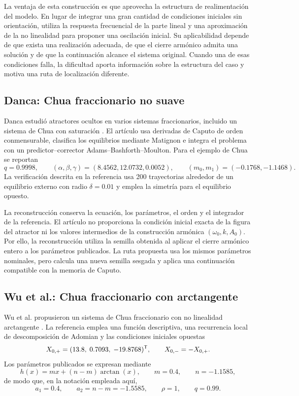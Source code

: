 La ventaja de esta construcción es que aprovecha la estructura de
realimentación del modelo. En lugar de integrar una gran cantidad de
condiciones iniciales sin orientación, utiliza la respuesta frecuencial
de la parte lineal y una aproximación de la no linealidad para proponer
una oscilación inicial. Su aplicabilidad depende de que exista una
realización adecuada, de que el cierre armónico admita una solución y
de que la continuación alcance el sistema original. Cuando una de esas
condiciones falla, la dificultad aporta información sobre la estructura
del caso y motiva una ruta de localización diferente.

\subsection{Danca: Chua fraccionario no suave}

Danca estudió atractores ocultos en varios sistemas fraccionarios, incluido un
sistema de Chua con saturación \cite{Danca2017}. El artículo usa derivadas
de Caputo de orden conmensurable, clasifica los equilibrios mediante Matignon e integra
el problema con un predictor--corrector Adams--Bashforth--Moulton. Para el
ejemplo de Chua se reportan
\[
q=0.9998,\qquad
(\alpha,\beta,\gamma)=(8.4562,12.0732,0.0052),\qquad
(m_0,m_1)=(-0.1768,-1.1468).
\]
La verificación descrita en la referencia usa 200 trayectorias alrededor de un
equilibrio externo con radio \(\delta=0.01\) y emplea la simetría para el
equilibrio opuesto.

La reconstrucción conserva la ecuación, los
parámetros, el orden y el integrador de la referencia. El artículo no
proporciona la condición inicial exacta de la figura del atractor ni los
valores intermedios de la construcción armónica
\((\omega_0,k,A_0)\). Por ello, la reconstrucción utiliza la semilla obtenida
al aplicar el cierre armónico entero a los parámetros publicados.
La ruta propuesta usa los mismos parámetros
nominales, pero calcula una nueva semilla sesgada y aplica una continuación
compatible con la memoria de Caputo.

\subsection{Wu et al.: Chua fraccionario con arctangente}

Wu et al. propusieron un sistema de Chua fraccionario con no linealidad
arctangente \cite{Wu2023ArctanChua}. La referencia emplea una función
descriptiva, una recurrencia local de descomposición de Adomian y las
condiciones iniciales opuestas
\[
X_{0,+}=(13.8,\;0.7093,\;-19.8768)^{\mathsf T},
\qquad X_{0,-}=-X_{0,+}.
\]
Los parámetros publicados se expresan mediante
\[
h(x)=mx+(n-m)\arctan(x),\qquad
m=0.4,\qquad n=-1.1585,
\]
de modo que, en la notación empleada aquí,
\[
a_1=0.4,\qquad a_2=n-m=-1.5585,\qquad \rho=1,\qquad q=0.99.
\]

